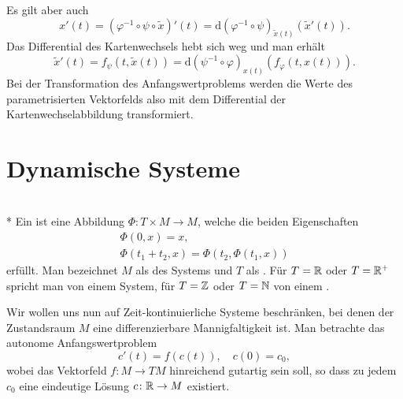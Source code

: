 Es gilt aber auch
\begin{equation}
x'(t) = (\varphi^{-1}\circ\psi\circ\tilde x)'(t)
= \mathrm d(\varphi^{-1}\circ\psi)_{\tilde x(t)}(\tilde x'(t)).
\end{equation}
Das Differential des Kartenwechsels hebt sich weg und man
erhält%
\begin{equation}
\tilde x'(t) = f_\psi(t,\tilde x(t))
= \mathrm d(\psi^{-1}\circ\varphi)_{x(t)}(f_\varphi(t,x(t))).
\end{equation}
Bei der Transformation des Anfangswertproblems werden die Werte des
parametrisierten Vektorfelds also mit dem Differential der
Kartenwechselabbildung transformiert.

\newpage
\section{Dynamische Systeme}

\begin{definition}\mbox{}\\*
Ein  ist eine Abbildung
$\Phi\colon T\times M\to M$, welche
die beiden Eigenschaften
\begin{gather}
\label{eq:dyn-Sys-1}
\Phi(0,x) = x,\\
\label{eq:dyn-Sys-2}
\Phi(t_1+t_2,x) = \Phi(t_2,\Phi(t_1,x))
\end{gather}
erfüllt. Man bezeichnet $M$ als  des Systems und
$T$ als .
Für $T=\mathbb R$ oder $T=\mathbb R^+$ spricht man von einem
 System, für $T=\mathbb Z$ oder $T=\mathbb N$ von einem
.
\end{definition}

\noindent
Wir wollen uns nun auf Zeit-kontinuierliche Systeme beschränken,
bei denen der Zustandsraum $M$ eine differenzierbare Mannigfaltigkeit
ist. Man betrachte das autonome Anfangswertproblem
\begin{equation}\label{eq:AWP-M}
c'(t) = f(c(t)),\quad c(0)=c_0,
\end{equation}
wobei das Vektorfeld $f\colon M\to TM$ hinreichend gutartig sein soll,
so dass zu jedem $c_0$ eine eindeutige Lösung $c\colon\mathbb R\to M$
existiert. 

